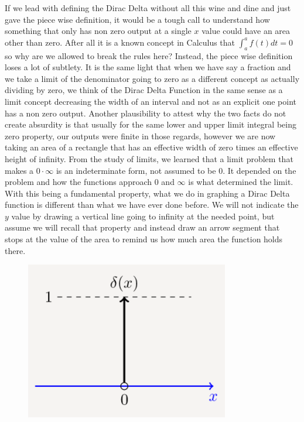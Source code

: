 \documentclass[12pt]{article}
\begin{document}
If we lead with defining the Dirac Delta without all this wine and dine and just gave the piece wise definition, it would be a tough call to understand how something that only has non zero output at a single $x$ value could have an area other than zero. After all it is a known concept in  Calculus that $\int_{a}^{a}f(t)dt=0$ so why are we allowed to break the rules here? Instead, the piece wise definition loses a lot of subtlety. It is the same light that when we have say a fraction and we take a limit of the denominator going to zero as a different concept as actually dividing by zero, we think of the Dirac Delta Function in the same sense as a limit concept decreasing the width of an interval and not as an explicit one point has a non zero output. Another plausibility to attest why the two facts do not create absurdity is that usually for the same lower and upper limit integral being zero property, our outputs were finite in those regards, however we are now taking an area of a rectangle that has an effective width of zero times an effective height of infinity. From the study of limits, we learned that a limit problem that makes a $0\cdot\infty$ is an indeterminate form, not assumed to be 0. It depended on the problem and how the functions approach 0 and $\infty$ is what determined the limit. \\

With this being a fundamental property, what we do in graphing a Dirac Delta function is different than what we have ever done before. We will not indicate the $y$ value by drawing a vertical line going to infinity at the needed point, but assume we will recall that property and instead draw an arrow segment that stops at the value of the area to remind us how much area the function holds there. 

\pagebreak

\begin{figure}[!htbp]
\centering
\includegraphics[scale=.8]{step11.PNG}
\label{fig:hsf11}
\end{figure}
\end{document}
